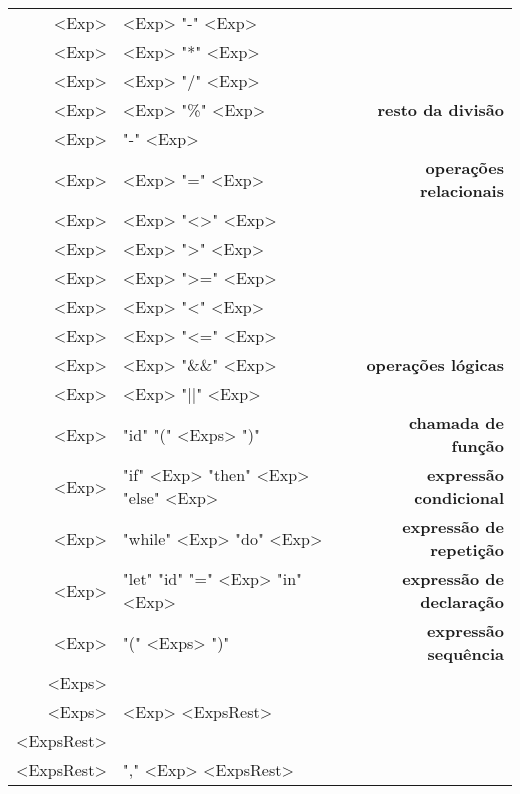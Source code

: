\documentclass[a4paper,10pt,brazil]{article}
\begin{document}
\begin{synshorts}
\begin{center}
\begin{tabular}{r@{$\;\rightarrow\;$}l>{\bfseries}r}
      <Exp>         & <Exp> "-" <Exp>                      &                         \\
      <Exp>         & <Exp> "*" <Exp>                      &                         \\
      <Exp>         & <Exp> "/" <Exp>                      &                         \\
      <Exp>         & <Exp> "\%" <Exp>                     & resto da divisão        \\
      <Exp>         & "-" <Exp>                            &                         \\
      <Exp>         & <Exp> "=" <Exp>                      & operações relacionais   \\
      <Exp>         & <Exp> "<>" <Exp>                     &                         \\
      <Exp>         & <Exp> ">" <Exp>                      &                         \\
      <Exp>         & <Exp> ">=" <Exp>                     &                         \\
      <Exp>         & <Exp> "<" <Exp>                      &                         \\
      <Exp>         & <Exp> "<=" <Exp>                     &                         \\
      <Exp>         & <Exp> "\&\&" <Exp>                   & operações lógicas       \\
      <Exp>         & <Exp> "||" <Exp>                     &                         \\
      <Exp>         & "id" "(" <Exps> ")"                  & chamada de função       \\
      <Exp>         & "if" <Exp> "then" <Exp> "else" <Exp> & expressão condicional   \\
      <Exp>         & "while" <Exp> "do" <Exp>             & expressão de repetição  \\
      <Exp>         & "let" "id" "=" <Exp> "in" <Exp>      & expressão de declaração \\
      <Exp>         & "(" <Exps> ")"                       & expressão sequência     \\[.9em]
      <Exps>        &                                      &                         \\
      <Exps>        & <Exp> <ExpsRest>                     &                         \\
      <ExpsRest>    &                                      &                         \\
      <ExpsRest>    & "," <Exp> <ExpsRest>                 &                         \\
    \end{tabular}
  \end{center}
\end{synshorts}
\end{document}
